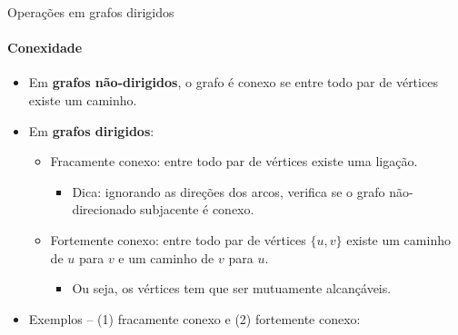 \begin{frame}{Operações em grafos dirigidos}
	\framesubtitle{Conexidade}
	
	\begin{itemize}
		\item Em \textbf{grafos não-dirigidos}, o grafo é conexo se entre todo par de vértices existe um caminho.
		
		\item Em \textbf{grafos dirigidos}:
		\begin{itemize}
			\item {\color{magenta}Fracamente conexo:} entre todo par de vértices existe uma ligação.
			\begin{itemize}
				\item Dica: ignorando as direções dos arcos, verifica se o grafo não-direcionado subjacente é conexo.
			\end{itemize}
			
			\item {\color{magenta}Fortemente conexo:} entre todo par de vértices $\{u, v\}$ existe um caminho de $u$ para $v$ e um caminho de $v$ para $u$.
			\begin{itemize}
				\item Ou seja, os vértices tem que ser mutuamente alcançáveis.
			\end{itemize}
		\end{itemize}
	
		\item Exemplos -- (1) fracamente conexo e (2) fortemente conexo:
	\end{itemize}

	\begin{figure}
	\end{figure}
\end{frame}



